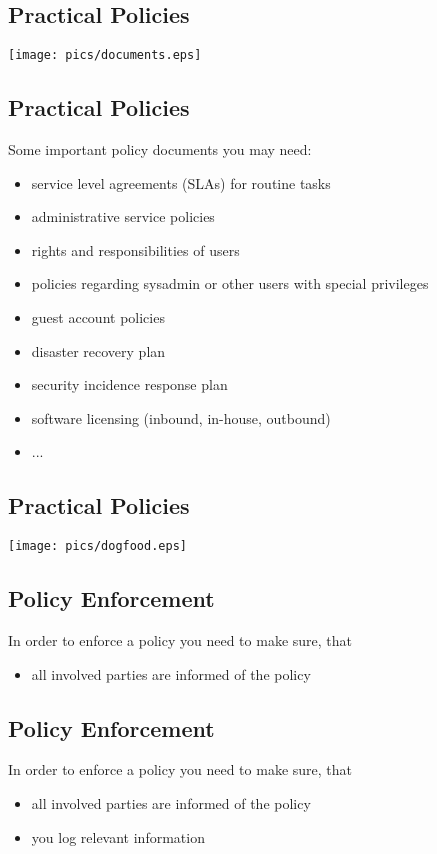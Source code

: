 \documentclass[xga]{xdvislides}
\begin{document}
\subsection{Practical Policies}

\begin{center}
	\texttt{[image: pics/documents.eps]}
\end{center}

\subsection{Practical Policies}
Some important policy documents you may need:
\begin{itemize}
	\item service level agreements (SLAs) for routine tasks
	\item administrative service policies
	\item rights and responsibilities of users
	\item policies regarding sysadmin or other users with special
		privileges
	\item guest account policies
	\item disaster recovery plan
	\item security incidence response plan
	\item software licensing (inbound, in-house, outbound)
	\item ...
\end{itemize}

\subsection{Practical Policies}
\begin{center}
	\texttt{[image: pics/dogfood.eps]}
\end{center}

\subsection{Policy Enforcement}
In order to enforce a policy you need to make sure, that
\begin{itemize}
	\item all involved parties are informed of the policy
\end{itemize}

\subsection{Policy Enforcement}
In order to enforce a policy you need to make sure, that
\begin{itemize}
	\item all involved parties are informed of the policy
	\item you log relevant information
\end{itemize}
\end{document}
